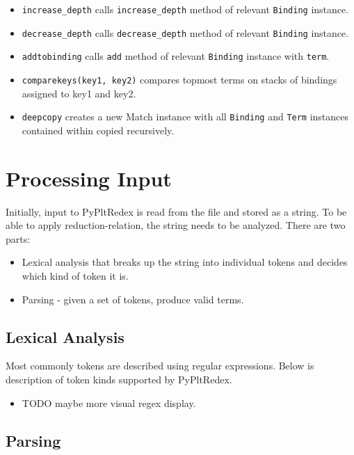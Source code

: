 \begin{itemize}
\item
\texttt{increase\_depth} calls \texttt{increase\_depth} method of relevant \texttt{Binding} instance.

\item
\texttt{decrease\_depth} calls \texttt{decrease\_depth} method of relevant \texttt{Binding} instance.

\item
\texttt{addtobinding} calls \texttt{add} method of relevant \texttt{Binding} instance with \texttt{term}.

\item
\texttt{comparekeys(key1, key2)} compares topmost terms on stacks of bindings assigned to key1 and key2.

\item
	\texttt{deepcopy} creates a new Match instance with all \texttt{Binding} and \texttt{Term} instances contained within copied recursively.
\end{itemize}

\section{Processing Input}

Initially, input to PyPltRedex is read from the file and stored as a string. To be able to apply reduction-relation, the string needs to be analyzed. There are two parts:

\begin{itemize}
\item
Lexical analysis that breaks up the string into individual tokens and decides which kind of token it is.
\item
Parsing - given a set of tokens, produce valid terms.
\end{itemize}


\subsection{Lexical Analysis}

Most commonly tokens are described using regular expressions. Below is description of token kinds supported by PyPltRedex.
\begin{itemize}
\item
	TODO maybe more visual regex display.
\end{itemize}

\subsection{Parsing}

